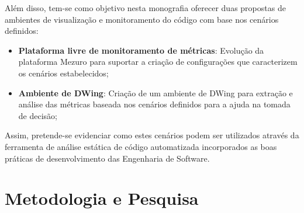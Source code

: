 %

Além disso, tem-se como objetivo nesta monografia oferecer duas propostas de ambientes de visualização e monitoramento do código com base nos cenários definidos:
\begin{itemize}
\item \textbf{Plataforma livre de monitoramento de métricas}: Evolução da plataforma Mezuro para suportar a criação de configurações que caracterizem os cenários estabelecidos;
\item \textbf{Ambiente de DWing}: Criação de um ambiente de DWing para extração e análise das métricas baseada nos cenários definidos para a ajuda na tomada de decisão;
\end{itemize}

Assim, pretende-se evidenciar como estes cenários podem ser utilizados através da ferramenta de análise estática de código automatizada incorporados as boas práticas de desenvolvimento das Engenharia de Software.




\section{Metodologia e Pesquisa}
